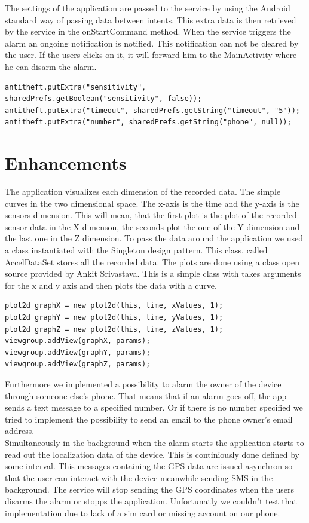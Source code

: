 \documentclass{report}
\begin{document}
The settings of the application are passed to the service by using the Android standard way of passing data between intents. This extra data is then retrieved by the service in the onStartCommand method. When the service triggers the alarm an ongoing notification is notified. This notification can not be cleared by the user. If the users clicks on it, it will forward him to the MainActivity where he can disarm the alarm.

\begin{lstlisting}
antitheft.putExtra("sensitivity", sharedPrefs.getBoolean("sensitivity", false));
antitheft.putExtra("timeout", sharedPrefs.getString("timeout", "5"));
antitheft.putExtra("number", sharedPrefs.getString("phone", null));
\end{lstlisting}

\section{Enhancements}

The application visualizes each dimension of the recorded data. The simple curves in the two dimensional space. The x-axis is the time and the y-axis is the sensors dimension. This will mean, that the first plot is the plot of the recorded sensor data in the X dimenson, the seconds plot the one of the Y dimension and the last one in the Z dimension. To pass the data around the application we used a class instantiated with the Singleton design pattern. This class, called AccelDataSet stores all the recorded data. The plots are done using a class open source provided by Ankit Srivastava\cite{androidplot}. This is a simple class with takes arguments for the x and y axis and then plots the data with a curve.

\begin{lstlisting}
plot2d graphX = new plot2d(this, time, xValues, 1);
plot2d graphY = new plot2d(this, time, yValues, 1);
plot2d graphZ = new plot2d(this, time, zValues, 1);
viewgroup.addView(graphX, params);
viewgroup.addView(graphY, params);
viewgroup.addView(graphZ, params);
\end{lstlisting}

Furthermore we implemented a possibility to alarm the owner of the device through someone else's phone. That means that if an alarm goes off, the app sends a text message to a specified number. Or if there is no number specified we tried to implement the possibility to send an email to the phone owner's email address. \\
Simultaneously in the background when the alarm starts the application starts to read out the localization data of the device. This is continiously done defined by some interval. This messages containing the GPS data are issued asynchron so that the user can interact with the device meanwhile sending SMS in the background. The service will stop sending the GPS coordinates when the users disarms the alarm or stopps the application. Unfortunatly we couldn't test that implementation due to lack of a sim card or missing account on our phone.
\end{document}
